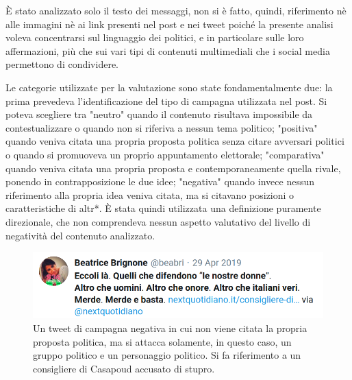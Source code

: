 È stato analizzato solo il testo dei messaggi, non si è fatto, quindi, riferimento nè alle immagini nè ai link presenti nel post e nei tweet poiché la presente analisi voleva concentrarsi sul linguaggio dei politici, e in particolare sulle loro affermazioni, più che sui vari tipi di contenuti multimediali che i social media permettono di condividere.

Le categorie utilizzate per la valutazione sono state fondamentalmente due: la prima  prevedeva l'identificazione del tipo di campagna utilizzata nel post. Si poteva scegliere tra "neutro" quando il contenuto risultava impossibile da contestualizzare o quando non si riferiva a nessun tema politico; "positiva" quando veniva citata una propria proposta politica senza citare avversari politici o quando si promuoveva un proprio appuntamento elettorale; "comparativa" quando veniva citata una propria proposta e contemporaneamente quella rivale, ponendo in contrapposizione le due idee; "negativa" quando invece nessun riferimento alla propria idea veniva citata, ma si citavano posizioni o caratteristiche di altr*.
È stata quindi utilizzata una definizione puramente direzionale, che non comprendeva nessun aspetto valutativo del livello di negatività del contenuto analizzato.
\begin{figure}
	\centering
	\includegraphics[width=\linewidth]{figures/negativapost}
	\caption{Un tweet di campagna negativa in cui non viene citata la propria proposta politica, ma si attacca solamente, in questo caso, un gruppo politico e un personaggio politico. Si fa riferimento a un consigliere di Casapoud accusato di stupro.}
	\label{esempi4}
\end{figure}

